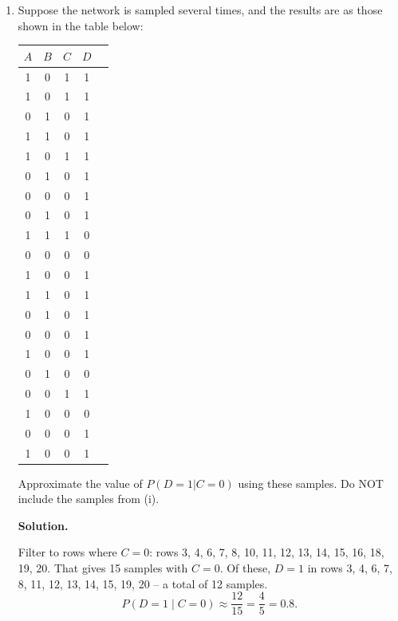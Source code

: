 \documentclass[12pt]{article}
\newenvironment{solution}{%
  \ifshowsolutions\begin{solutionbox}\noindent\textbf{\color{blue!70!black}Solution.}\quad\fi
  \ifshowsolutions\else\expandafter\comment\fi
}{%
  \ifshowsolutions\end{solutionbox}\fi
  \ifshowsolutions\else\expandafter\endcomment\fi
}
\begin{document}
\begin{enumerate}
\begin{enumerate}
\begin{enumerate}
        \clearpage
          \item Suppose the network is sampled several times, and the results are as those shown in the table below:
                \begin{table}[H]
                  \centering
                  \begin{tabular}{|c|c|c|c|c|}
                    \hline
                    $A$ & $B$ & $C$ & $D$ \\
                    \hline
                    1   & 0   & 1   & 1   \\\hline
                    1   & 0   & 1   & 1   \\\hline
                    0   & 1   & 0   & 1  \\\hline
                    1   & 1   & 0   & 1    \\\hline
                    1   & 0   & 1   & 1  \\\hline
                    0   & 1   & 0   & 1   \\\hline
                    0   & 0   & 0   & 1   \\\hline
                    0   & 1   & 0   & 1    \\\hline
                    1   & 1   & 1   & 0    \\\hline
                    0   & 0   & 0   & 0    \\\hline
                    1   & 0   & 0   & 1   \\\hline
                    1   & 1   & 0   & 1   \\\hline
                    0   & 1   & 0   & 1    \\\hline
                    0   & 0   & 0   & 1   \\\hline
                    1   & 0   & 0   & 1    \\\hline
                    0   & 1   & 0   & 0     \\\hline
                    0   & 0   & 1   & 1    \\\hline
                    1   & 0   & 0   & 0   \\\hline
                    0   & 0   & 0   & 1    \\\hline
                    1   & 0   & 0   & 1    \\\hline
                  \end{tabular}
                \end{table}
                Approximate the value of $P(D=1|C=0)$ using these samples. Do NOT include the samples from (i).

          \begin{solution}
            Filter to rows where $C=0$: rows 3, 4, 6, 7, 8, 10, 11, 12, 13, 14, 15, 16, 18, 19, 20.
            That gives 15 samples with $C=0$. Of these, $D=1$ in rows 3, 4, 6, 7, 8, 11, 12, 13, 14, 15, 19, 20 -- a total of 12 samples.
            \[
              P(D=1\mid C=0) \approx \frac{12}{15} = \frac{4}{5} = 0.8.
            \]
          \end{solution}
        \end{enumerate}
\end{enumerate}
\end{enumerate}
\clearpage
\end{document}
